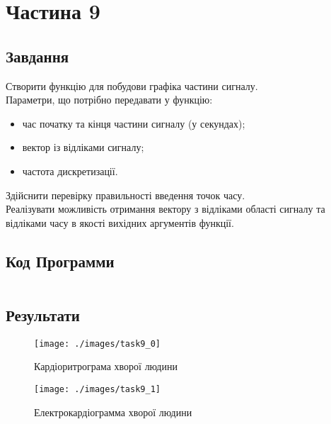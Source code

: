 \section{Частина 9}
\label{sec:task9}

\subsection{Завдання}
\label{subsec:task9_task}

Створити функцію для побудови графіка частини сигналу. \\
Параметри, що потрібно передавати у функцію:

\begin{itemize}
    \item час початку та кінця частини сигналу (у секундах);
    \item вектор із відліками сигналу;
    \item частота дискретизації.
\end{itemize}

Здійснити перевірку правильності введення точок часу. \\
Реалізувати можливість отримання вектору з відліками області сигналу
та відліками часу в якості вихідних аргументів функції.

\subsection{Код Программи}
\label{subsec:task9_code}
\inputminted{python}{../src/task9.py}

\subsection{Результати}
\label{subsec:task9_results}

\begin{figure}[!ht]
    \centering
    \texttt{[image: ./images/task9\_0]}
    \caption{Кардіоритрограма хворої людини}
    \label{fig:hr_apnea_slice}
\end{figure}

\begin{figure}[!ht]
    \centering
    \texttt{[image: ./images/task9\_1]}
    \caption{Електрокардіограмма хворої людини}
    \label{fig:ecg_anomaly_slice}
\end{figure}
